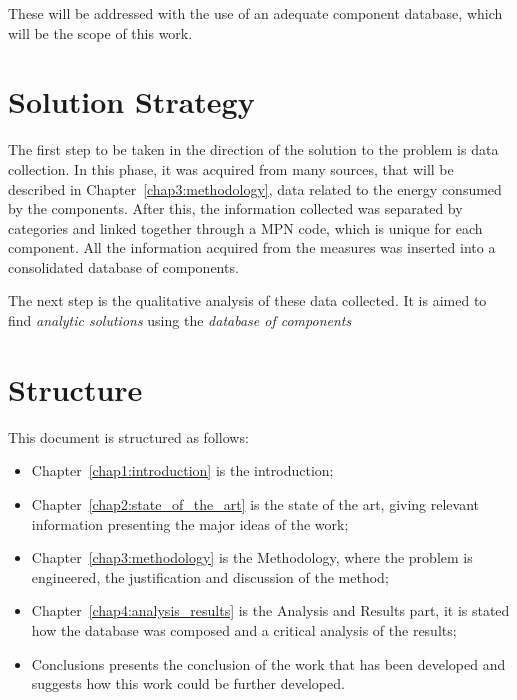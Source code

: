     These will be addressed with the use of an adequate component database, which will be the scope of this work.

\section{Solution Strategy} \label{sec1:solution_strategy}
    The first step to be taken in the direction of the solution to the problem is data collection. In this phase, it was acquired from many sources, that will be described in Chapter~\ref{chap3:methodology}, data related to the energy consumed by the components. After this, the information collected was separated by categories and linked together through a MPN code, which is unique for each component. All the information acquired from the measures was inserted into a consolidated database of components.
    
    The next step is the qualitative analysis of these data collected. It is aimed to find \emph{analytic solutions} using the \emph{database of components}


\section{Structure} \label{sec1:structure}
    This document is structured as follows:
    \begin{itemize}
        \item Chapter~\ref{chap1:introduction} is the introduction;
        \item Chapter~\ref{chap2:state_of_the_art} is the state of the art, giving relevant information presenting the major ideas of the work;
        \item Chapter~\ref{chap3:methodology} is the Methodology, where the problem is engineered, the justification and discussion of the method;
        \item Chapter~\ref{chap4:analysis_results} is the Analysis and Results part, it is stated how the database was composed and a critical analysis of the results;
        \item Conclusions presents the conclusion of the work that has been developed and suggests how this work could be further developed.

    \end{itemize}
    
    

